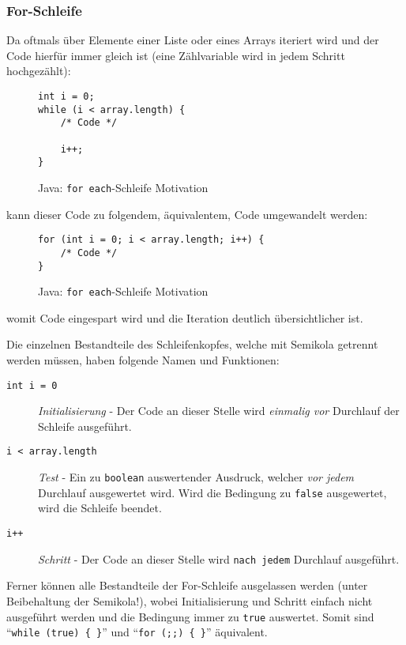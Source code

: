 	\subsubsection{For-Schleife}
		Da oftmals über Elemente einer Liste oder eines Arrays iteriert wird und der Code hierfür immer gleich ist (eine Zählvariable wird in jedem Schritt hochgezählt):
		\begin{figure}[H]
			\centering
			\begin{lstlisting}
int i = 0;
while (i < array.length) {
	/* Code */

	i++;
}
			\end{lstlisting}
			\caption{Java: \texttt{for each}-Schleife Motivation}
		\end{figure}
		kann dieser Code zu folgendem, äquivalentem, Code umgewandelt werden:
		\begin{figure}[H]
			\centering
			\begin{lstlisting}
for (int i = 0; i < array.length; i++) {
	/* Code */
}
			\end{lstlisting}
			\caption{Java: \texttt{for each}-Schleife Motivation}
		\end{figure}
		womit Code eingespart wird und die Iteration deutlich übersichtlicher ist.
		
		Die einzelnen Bestandteile des Schleifenkopfes, welche mit Semikola getrennt werden müssen, haben folgende Namen und Funktionen:
		\begin{description}
			\item[\texttt{int i = 0}] \textit{Initialisierung} - Der Code an dieser Stelle wird \textit{einmalig vor} Durchlauf der Schleife ausgeführt.
			\item[\texttt{i < array.length}] \textit{Test} - Ein zu \texttt{boolean} auswertender Ausdruck, welcher \textit{vor jedem} Durchlauf ausgewertet wird. Wird die Bedingung zu \texttt{false} ausgewertet, wird die Schleife beendet.
			\item[\texttt{i++}] \textit{Schritt} - Der Code an dieser Stelle wird \texttt{nach jedem} Durchlauf ausgeführt.
		\end{description}
		
		Ferner können alle Bestandteile der For-Schleife ausgelassen werden (unter Beibehaltung der Semikola!), wobei Initialisierung und Schritt einfach nicht ausgeführt werden und die Bedingung immer zu \texttt{true} auswertet. Somit sind \enquote{\texttt{while (true) \{ \}}} und \enquote{\texttt{for (;;) \{ \}}} äquivalent.
	
